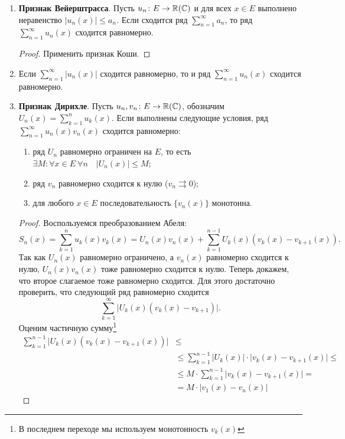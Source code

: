 \begin{prop}
\begin{enumerate}
		\item {\bf Признак Вейерштрасса}. Пусть $ u_n\colon E \to  \mathbb{R}(\mathbb{C})$ и для всех $ x \in E$ выполнено неравенство $ \lvert u_n(x)  \rvert \le a_n$. Если сходится ряд $ \sum_{n=1}^{\infty} a_n$, то ряд $ \sum_{n=1}^{\infty} u_n(x)$ сходится равномерно.
			\begin{proof}
				Применить признак Коши.
			\end{proof}
		\item Если $ \sum_{n=1}^{\infty} \lvert u_n(x) \rvert $ сходится равномерно, то и ряд $ \sum_{n=1}^{\infty} u_n(x)$ сходится равномерно.
		\item {\bf Признак Дирихле}. Пусть $ u_n, v_n \colon E \to \mathbb{R}(\mathbb{C})$, обозначим  $ U_n(x) = \sum_{k=1}^{n} u_k(x)$. Если выполнены следующие условия, ряд $ \sum_{n=1}^{\infty} u_n(x)v_n(x)$ сходится равномерно:
			\begin{enumerate}[noitemsep]
				\item ряд $ U_n$ равномерно ограничен на $ E$, то есть
					$
					\exists M\colon \forall x \in E ~ \forall n \quad \lvert U_n(x) \rvert \le M
					$;
				\item ряд $ v_n$ равномерно сходится к нулю ($ v_n \rightrightarrows 0$);
				\item для любого $ x \in E$ последовательность $ \{v_n(x)\}$ монотонна.
			\end{enumerate}
			\begin{proof}
				Воспользуемся преобразованием Абеля:
				\[
					S_n(x) = \sum_{k=1}^{n} u_k(x)v_k(x) = U_n(x)v_n(x) + \sum_{k=1}^{n-1} U_k(x) (v_k(x) - v_{k+1}(x))
				.\]
				Так как  $ U_n(x)$ равномерно ограничено, а $ v_n(x) $ равномерно сходится к нулю, $ U_n(x)v_n(x)$ тоже равномерно сходится к нулю. Теперь докажем, что второе слагаемое тоже равномерно сходится. Для этого достаточно проверить, что следующий ряд равномерно сходится
				\[
					\sum_{k=1}^{\infty} \lvert U_k(x) (v_k(x) - v_{k+1}) \rvert
				.\]
				Оценим частичную сумму\footnote{В последнем переходе мы используем монотонность $ v_k(x)$}
				\[
					\begin{aligned}
						\sum_{k=1}^{n-1} \lvert U_k(x) (v_k(x) - v_{k+1}(x)) \rvert & \le \\
																					& \le \sum_{k=1}^{n-1} \lvert U_k(x) \rvert \cdot \lvert v_k(x) - v_{k+1}(x) \rvert \le  \\
																					& \le M \cdot \sum_{k=1}^{n-1} \lvert v_k(x) - v_{k+1}(x) \rvert = \\
																					& = M \cdot \lvert v_1(x) - v_n(x) \rvert

\end{aligned}\]
\end{proof}
\end{enumerate}
\end{prop}
